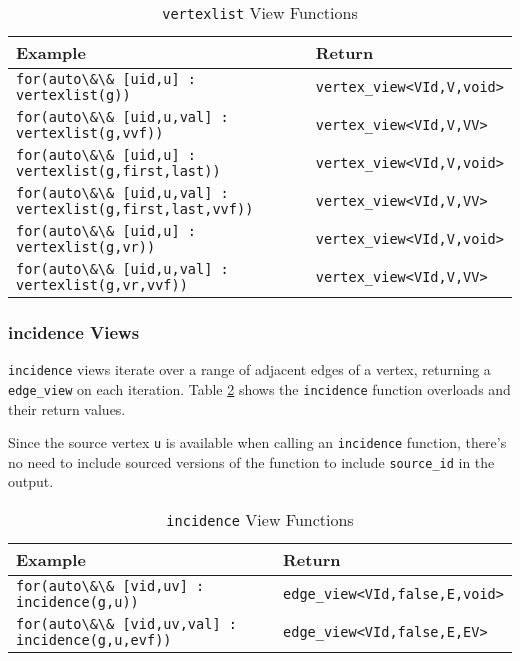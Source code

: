 \documentclass[10pt,onecolumn]{article}
\newcommand{\tcode}[1]{\lstinline[breaklines=true]{#1}}
\begin{document}
\begin{table}[h!]
\begin{center}
{\begin{tabular}{l l}
\hline
    \textbf{Example} & \textbf{Return} \\
\hline
    \tcode{for(auto\&\& [uid,u] : vertexlist(g))} & \tcode{vertex_view<VId,V,void>} \\
    \tcode{for(auto\&\& [uid,u,val] : vertexlist(g,vvf))} & \tcode{vertex_view<VId,V,VV>} \\
    \tcode{for(auto\&\& [uid,u] : vertexlist(g,first,last))} & \tcode{vertex_view<VId,V,void>} \\
    \tcode{for(auto\&\& [uid,u,val] : vertexlist(g,first,last,vvf))} & \tcode{vertex_view<VId,V,VV>} \\
    \tcode{for(auto\&\& [uid,u] : vertexlist(g,vr))} & \tcode{vertex_view<VId,V,void>} \\
    \tcode{for(auto\&\& [uid,u,val] : vertexlist(g,vr,vvf))} & \tcode{vertex_view<VId,V,VV>} \\
\hline
\end{tabular}}
\caption{\tcode{vertexlist} View Functions}
\label{tab:vertexlist}
\end{center}
\end{table}

\subsubsection{incidence Views}
\tcode{incidence} views iterate over a range of adjacent edges of a vertex, returning a \tcode{edge_view} on each iteration. 
Table \ref{tab:incidence} shows the \tcode{incidence} function overloads and their return values. 

Since the source vertex \tcode{u} is available when calling an \tcode{incidence} function, there's no need to include sourced versions of the function to include \tcode{source_id} in the output.

\begin{table}[h!]
\begin{center}
{\begin{tabular}{l l}
\hline
    \textbf{Example} & \textbf{Return} \\
\hline
    \tcode{for(auto\&\& [vid,uv] : incidence(g,u))} & \tcode{edge_view<VId,false,E,void>} \\
    \tcode{for(auto\&\& [vid,uv,val] : incidence(g,u,evf))} & \tcode{edge_view<VId,false,E,EV>} \\
\hline
\end{tabular}}
\caption{\tcode{incidence} View Functions}
\label{tab:incidence}
\end{center}
\end{table}
\end{document}
